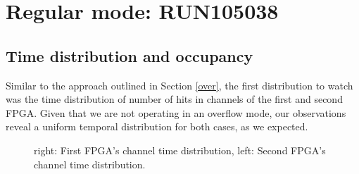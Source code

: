 

\section{Regular mode: RUN105038}
\subsection{Time distribution and occupancy}
Similar to the approach outlined in Section \ref{over}, the first distribution to watch was the time distribution of number of hits in channels of the first and second FPGA. Given that we are not operating in an overflow mode, our observations reveal a uniform temporal distribution for both cases, as we expected.
\begin{figure}[H]
  \hspace{-0.5in}
  \caption{
    \label{fig:4}
    right: First FPGA's channel time distribution, left: Second FPGA's channel time distribution.
  }
\end{figure}
